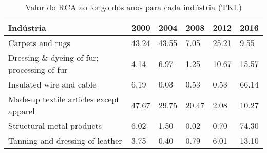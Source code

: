 \begin{table}
\centering
\caption{Valor do RCA ao longo dos anos para cada indústria (TKL)}
\label{tab:ex3-tempo-TKL}
\begin{tabular}{p{6cm}p{1.5cm}p{1.5cm}p{1.5cm}p{1.5cm}p{1.5cm}}
\toprule
                                  Indústria &  2000 &  2004 &  2008 &  2012 &  2016 \\
\midrule
                           Carpets and rugs & 43.24 & 43.55 &  7.05 & 25.21 &  9.55 \\
Dressing \& dyeing of fur; processing of fur &  4.14 &  6.97 &  1.25 & 10.67 & 15.57 \\
                   Insulated wire and cable &  6.19 &  0.03 &  0.53 &  0.53 & 66.14 \\
    Made-up textile articles except apparel & 47.67 & 29.75 & 20.47 &  2.08 & 10.27 \\
                  Structural metal products &  6.02 &  1.50 &  0.02 &  0.70 & 74.30 \\
            Tanning and dressing of leather &  3.75 &  0.40 &  0.79 &  6.01 & 13.10 \\
\bottomrule
\end{tabular}
\end{table}
